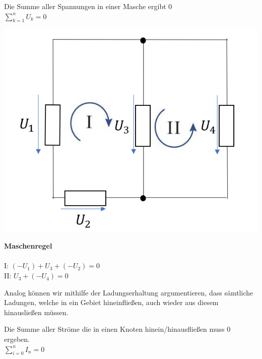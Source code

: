 										\beginip
										Die Summe aller Spannungen in einer Masche ergibt $0$ \\
										\formulaBegin
										$\displaystyle \sum_{k=1}^n U_k = 0$
										\formulaEnd

										\iend

										\begin{minipage}{0.6\textwidth}
											\begin{flushright}
											\includegraphics[scale=0.45]{img/maschenregel-2.png}
										\end{flushright}
										\end{minipage}
										\begin{minipage}{0.4\textwidth}
											\textbf{Maschenregel} \\ \\
											I: $\displaystyle (- U_1) + U_3 + (-U_2)  = 0$ \\
											II: $\displaystyle U_3 + (- U_4) = 0 $ \\
										\end{minipage}

										Analog können wir mithilfe der Ladungserhaltung argumentieren, dass sämtliche Ladungen, welche in ein Gebiet hineinfließen, auch wieder aus diesem hinausließen müssen.

										\beginip
										Die Summe aller Ströme die in einen Knoten hinein/hinausfließen muss $0$ ergeben. \\
										\formulaBegin
										$\displaystyle\sum_{i=0}^n I_n = 0 $
										\formulaEnd
					          \iend

